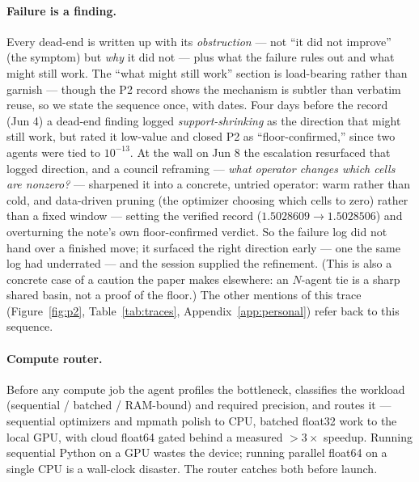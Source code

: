 \documentclass[11pt]{article}
\newcommand{\src}[1]{}
\begin{document}
\paragraph{Failure is a finding.}
Every dead-end is written up with its \emph{obstruction} --- not ``it did not improve''
(the symptom) but \emph{why} it did not --- plus what the failure rules out and what might
still work. The ``what might still work'' section is load-bearing rather than garnish --- though
the P2 record shows the mechanism is subtler than verbatim reuse, so we state the sequence once,
with dates. Four days before the record (Jun 4) a dead-end finding logged \emph{support-shrinking}
as the direction that might still work, but rated it low-value and closed P2 as
``floor-confirmed,'' since two agents were tied to $10^{-13}$. At the wall on Jun 8 the escalation
resurfaced that logged direction, and a council reframing --- \emph{what operator changes which
cells are nonzero?} --- sharpened it into a concrete, untried operator: warm rather than cold, and
data-driven pruning (the optimizer choosing which cells to zero) rather than a fixed window --- setting the
verified record ($1.5028609\!\to\!1.5028506$) and overturning the note's own floor-confirmed
verdict. So the failure log did not hand over a finished move; it surfaced the right direction
early --- one the same log had underrated --- and the session supplied the refinement. (This is
also a concrete case of a caution the paper makes elsewhere: an $N$-agent tie is a sharp shared
basin, not a proof of the floor.) The other mentions of this trace (Figure~\ref{fig:p2},
Table~\ref{tab:traces}, Appendix~\ref{app:personal}) refer back to this sequence.
\src{.claude/rules/failure-is-a-finding.md, findings/dead-end-p2-compact-support-basin-floor.md, findings/p2-warm-self-pruning-beats-record.md}

\paragraph{Compute router.}
Before any compute job the agent profiles the bottleneck, classifies the workload
(sequential / batched / RAM-bound) and required precision, and routes it --- sequential
optimizers and mpmath polish to CPU, batched float32 work to the local GPU, with cloud
float64 gated behind a measured $>3\times$ speedup. Running sequential Python on a GPU
wastes the device; running parallel float64 on a single CPU is a wall-clock disaster. The
router catches both before launch. \src{.claude/rules/compute-router.md, .claude/rules/axioms.md (A4)}
\end{document}
